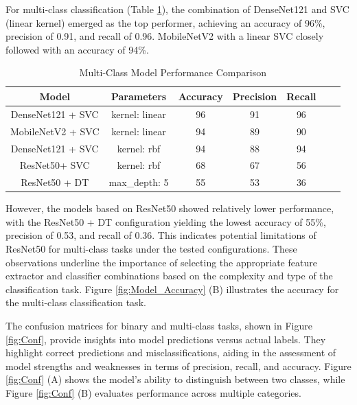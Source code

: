 \documentclass[12pt,a4paper]{report}
\begin{document}
For multi-class classification (Table \ref{tab:MC}), the combination of DenseNet121 and SVC (linear kernel) emerged as the top performer, achieving an accuracy of 96\%, precision of 0.91, and recall of 0.96. MobileNetV2 with a linear SVC closely followed with an accuracy of 94\%. 
\renewcommand{\arraystretch}{1.9}
\begin{table}[h!]
	\renewcommand\thetable{4.3}
	\centering
	\caption{Multi-Class Model Performance Comparison}
	\begin{tabular}{|c|c|c|c|c|c|c|}
		\hline
		\textbf{ Model}      & \textbf{Parameters}      & \textbf{Accuracy} & \textbf{Precision} & \textbf{Recall} \\ \hline
		DenseNet121 + SVC & kernel: linear & 96 & 91 & 96 \\ \hline
		MobileNetV2 + SVC & kernel: linear & 94 & 89 & 90 \\ \hline
		DenseNet121 + SVC & kernel: rbf    & 94 & 88 & 94 \\ \hline
		ResNet50+ SVC & kernel: rbf       & 68 & 67 & 56 \\ \hline
		ResNet50 + DT & max\_depth: 5   & 55 & 53 & 36 \\ \hline
	\end{tabular}
	
	\label{tab:MC}
\end{table}
However, the models based on ResNet50 showed relatively lower performance, with the ResNet50 + DT configuration yielding the lowest accuracy of 55\%, precision of 0.53, and recall of 0.36. This indicates potential limitations of ResNet50 for multi-class tasks under the tested configurations. These observations underline the importance of selecting the appropriate feature extractor and classifier combinations based on the complexity and type of the classification task. Figure \ref{fig:Model_Accuracy} (B) illustrates the accuracy for the multi-class classification task.
 
 

The confusion matrices for binary and multi-class tasks, shown in Figure \ref{fig:Conf}, provide insights into model predictions versus actual labels. They highlight correct predictions and misclassifications, aiding in the assessment of model strengths and weaknesses in terms of precision, recall, and accuracy. Figure \ref{fig:Conf} (A) shows the model's ability to distinguish between two classes, while Figure \ref{fig:Conf} (B) evaluates performance across multiple categories.
\end{document}
